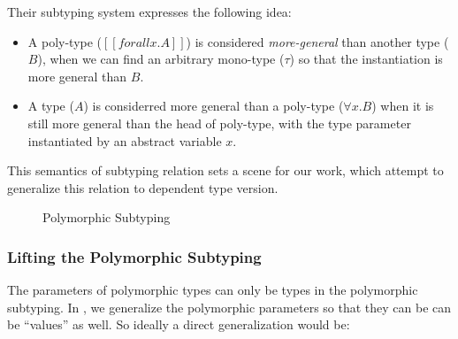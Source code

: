 Their subtyping system expresses the following idea:

\begin{itemize}
  \item A poly-type ($[[forall x. A]]$) is considered \emph{more-general}
        than another type ($B$), when we can find an arbitrary mono-type ($\tau$)
        so that the instantiation is more general than $B$.
  \item A type ($A$) is considerred more general than a poly-type ($\forall x. B$)
        when it is still more general than the head of poly-type, with the type
        parameter instantiated by an abstract variable $x$.
\end{itemize}

This semantics of subtyping relation sets a scene for our work, which attempt
to generalize this relation to dependent type version.

\begin{figure}
\label{fig:polymorphic-subtyping}
\centering


\caption{Polymorphic Subtyping}
\end{figure}


\subsubsection{Lifting the Polymorphic Subtyping}
\label{sec:polymorphic-subtyping}

The parameters of polymorphic types can only be types in the polymorphic
subtyping. In \name, we generalize the polymorphic parameters so that they can
be can be ``values'' as well. So ideally a direct generalization would be:



